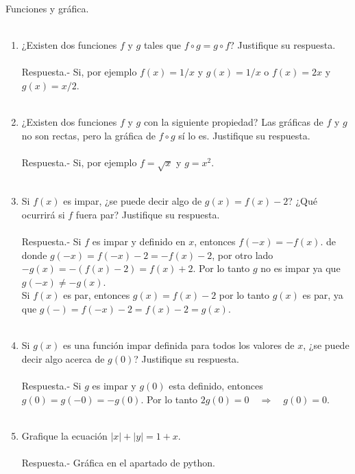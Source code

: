 Funciones y gráfica.\\\\

\begin{enumerate}

\item ¿Existen dos funciones $f$ y $g$ tales que $f\circ g = g \circ f$? Justifique su respuesta.\\\\
    Respuesta.-\; Si, por ejemplo $f(x) = 1/x$ y $g(x) = 1/x$ o $f(x) = 2x$ y $g(x) = x/2$.\\\\ 

\item ¿Existen dos funciones $f$ y $g$ con la siguiente propiedad? Las gráficas de $f$ y $g$ no son rectas, pero la gráfica de $f \circ g$ sí lo es. Justifique su respuesta.\\\\
    Respuesta.-\; Si, por ejemplo $f = \sqrt{x}$ y $g = x^2$.\\\\

\item Si $f(x)$ es impar, ¿se puede decir algo de $g(x) = f(x) - 2$? ¿Qué ocurrirá si $f$ fuera par? Justifique su respuesta.\\\\
    Respuesta.-\; Si $f$ es impar y definido en $x$, entonces $f(-x) = -f(x).$ de donde $g(-x) = f(-x) - 2 = -f(x) - 2$, por otro lado $-g(x) = -(f(x)-2) = f(x) + 2$. Por lo tanto  $g$ no es impar ya que $g(-x) \neq -g(x)$.\\
	Si $f(x)$ es par, entonces $g(x) = f(x) - 2$ por lo tanto $g(x)$  es par, ya que $g(-) = f(-x) - 2 = f(x) -2 = g(x)$.\\\\

\item Si $g(x)$ es una función impar definida para todos los valores de $x$, ¿se puede decir algo acerca de $g(0)$? Justifique su respuesta.\\\\
    Respuesta.-\; Si $g$ es impar y $g(0)$ esta definido, entonces $g(0) = g(-0) = -g(0)$. Por lo tanto $2g(0) = 0 \quad \Longrightarrow \quad g(0) = 0$.\\\\

\item Grafique la ecuación $|x| + |y| = 1+x$.\\\\
    Respuesta.-\; Gráfica en el apartado de python.\\\\


\end{enumerate}
